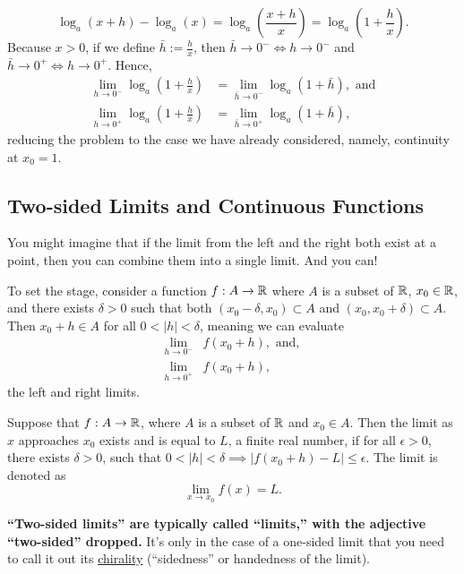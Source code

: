 \begin{enumerate}
    $$\log_a(x+h) - \log_a(x) = \log_a \left( \frac{x+h}{x} \right) =  \log_a \left( 1 + \frac{h}{x} \right).$$ 
    Because $x>0$, if we define $\bar{h}:=\frac{h}{x}$, then $\bar{h} \to 0^- \iff h \to 0^-$ and $\bar{h} \to 0^+ \iff h \to 0^+$. Hence, 
        \begin{align*}
        \lim_{h \to 0^-} \log_a(1+\frac{h}{x}) &=  \lim_{\bar{h} \to 0^-} \log_a(1+\bar{h}), \text{ and} \\
         \lim_{h \to 0^+} \log_a(1+\frac{h}{x}) &=  \lim_{\bar{h} \to 0^+} \log_a(1+\bar{h}),
    \end{align*}
    reducing the problem to the case we have already considered, namely, continuity at $x_0 = 1$.

\end{enumerate}
    \Qed

\subsection{Two-sided Limits and Continuous Functions}  

You might imagine that if the limit from the left and the right both exist at a point, then you can combine them into a single limit. And you can! 

\begin{tcolorbox}[colback=mylightblue, title = {\bf Two-sided Limit at a Point}, breakable]
 To set the stage, consider a function $f:A \to \mathbb R$ where $A$ is a subset of $\mathbb R$, $x_0 \in \mathbb R$, and there exists $\delta>0$ such that both $(x_0 - \delta, x_0 ) \subset A$ and $(x_0 , x_0 + \delta) \subset A$. Then $x_0 + h \in A$ for all  $0<|h|<\delta$, meaning we can evaluate 
\begin{align*}
    \lim_{h \to 0^-} &f(x_0 + h ), \text{ and}, \\
    \lim_{h \to 0^+} &f(x_0 + h ),
\end{align*}
the left and right limits. 

\begin{definition} \label{def:TwoSidedLimitAtZero} Suppose that $f:A \to \mathbb R$, where $A$ is a subset of $\mathbb R$ and $x_0 \in A$. Then the limit as $x$ approaches $x_0$ exists and is equal to $L$, a finite real number, if for all $\epsilon>0$, there exists $\delta >0$, such that $0 < |h| < \delta \implies |f(x_0+h) -L| \le \epsilon.$ The limit is denoted as
$$ \lim_{x \to x_0} f(x) = L.$$
\end{definition}

\textbf{``Two-sided limits'' are typically called ``limits,'' with the adjective ``two-sided'' dropped.} It's only in the case of a one-sided limit that you need to call it out its \href{https://en.wikipedia.org/wiki/Sinistral_and_dextral}{chirality} (``sidedness'' or handedness of the limit).
\end{tcolorbox}

